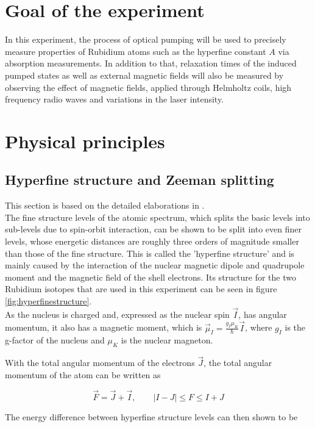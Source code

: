 \section{Goal of the experiment}
In this experiment, the process of optical pumping will be used to precisely measure properties of Rubidium atoms such as the hyperfine constant $A$ via absorption measurements. In addition to that, relaxation times of the induced pumped states as well as external magnetic fields will also be measured by observing the effect of magnetic fields, applied through Helmholtz coils, high frequency radio waves and variations in the laser intensity.
\section{Physical principles}
\subsection{Hyperfine structure and Zeeman splitting}
This section is based on the detailed elaborations in \cite{staatsex}.\\
The fine structure levels of the atomic spectrum, which splits the basic levels into sub-levels due to spin-orbit interaction, can be shown to be split into even finer levels, whose energetic distances are roughly three orders of magnitude smaller than those of the fine structure. This is called the 'hyperfine structure' and is mainly caused by the interaction of the nuclear magnetic dipole and quadrupole moment and the magnetic field of the shell electrons. Its structure for the two Rubidium isotopes that are used in this experiment can be seen in figure \ref{fig:hyperfinestructure}.\\

As the nucleus is charged and, expressed as the nuclear spin $\vec{I}$, has angular momentum, it also has a magnetic moment, which is $\vec{\mu}_I=\frac{g_I\mu_K}{\hbar}\vec{I}$, where $g_I$ is the g-factor of the nucleus and $\mu_K$ is the nuclear magneton. 

With the total angular momentum of the electrons $\vec{J}$, the total angular momentum of the atom can be written as

\begin{equation}
\vec{F}=\vec{J}+\vec{I},\qquad \lvert I-J\rvert\le F \le I+J
\end{equation}

The energy difference between hyperfine structure levels can then shown to be

